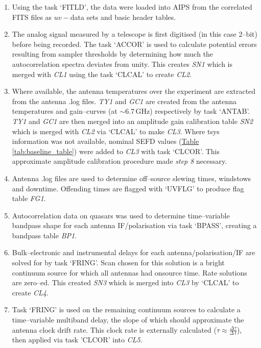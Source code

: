         \begin{enumerate}
            \item Using the task `FITLD', the data were loaded into AIPS from the correlated FITS files as $uv-$data sets and basic header tables.           
            \item The analog signal measured by a telescope is first digitised (in this case 2--bit) before being recorded. The task `ACCOR' is used to calculate potential errors resulting from sampler thresholds by determining how much the autocorrelation spectra deviates from unity. This creates \textit{SN1} which is merged with \textit{CL1} using the task `CLCAL' to create \textit{CL2}.            
            \item Where available, the antenna temperatures over the experiment are extracted from the antenna .log files. \textit{TY1} and \textit{GC1} are created from the antenna temperatures and gain--curves (at $\sim6.7$\,GHz) respectively by \aips\space task `ANTAB'. \textit{TY1} and \textit{GC1} are then merged into an amplitude gain calibration table \textit{SN2} which is merged with \textit{CL2} via `CLCAL' to make \textit{CL3}. Where tsys information was not available, nominal SEFD values (\hyperref[tab:baseline_table]{Table \ref*{tab:baseline_table}}) were added to \textit{CL3} with task `CLCOR'. This approximate amplitude calibration procedure made {\it step 8} necessary.            
            \item Antenna .log files are used to determine off--source slewing times, windstows and downtime. Offending times are flagged with `UVFLG' to produce flag table \textit{FG1}.            
            \item Autocorrelation data on quasars was used to determine time--variable bandpass shape for each antenna IF/polarisation via task `BPASS', creating a bandpass table \textit{BP1}.         
            \item Bulk--electronic and instrumental delays for each antenna/polarisation/IF are solved for by task `FRING'. Scan chosen for this solution is a bright continuum source for which all antennas had onsource time. Rate solutions are zero--ed. This created \textit{SN3} which is merged into \textit{CL3} by `CLCAL' to create \textit{CL4}.        
            \item Task `FRING' is used on the remaining continuum sources to calculate a time--variable multiband delay, the slope of which should approximate the antenna clock drift rate. This clock rate is externally calculated ($\dot{\tau}\approx\frac{\Delta\tau}{\Delta\,t}$), then applied via task 'CLCOR' into \textit{CL5}.          

\end{enumerate}
